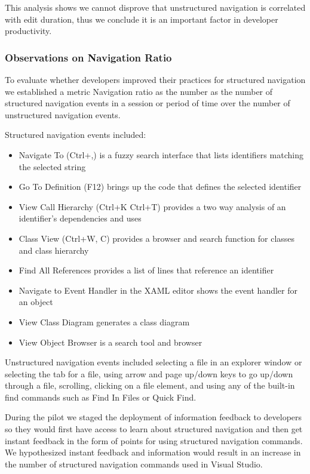 \documentclass{sig-alternate}
\begin{document}
This analysis shows we cannot disprove that unstructured navigation is correlated with edit duration, thus we conclude it is an important factor in developer productivity.  

\subsubsection{Observations on Navigation Ratio}

To evaluate whether developers improved their practices for structured navigation we established a metric Navigation ratio as the number as the number of structured navigation events in a session or period of time over the number of unstructured navigation events.  

Structured navigation events included: 
\begin{itemize}[itemsep=0mm]
\item Navigate To (Ctrl+,) is a fuzzy search interface that lists identifiers matching the selected string 
\item Go To Definition (F12) brings up the code that defines the selected identifier 
\item View Call Hierarchy (Ctrl+K Ctrl+T) provides a two way analysis of an identifier's dependencies and uses
\item Class View (Ctrl+W, C) provides a browser and search function for classes and class hierarchy
\item Find All References provides a list of lines that reference an identifier
\item Navigate to Event Handler in the XAML editor shows the event handler for an object
\item View Class Diagram generates a class diagram 
\item View Object Browser is a search tool and browser
\end{itemize}

Unstructured navigation events included selecting a file in an explorer window or selecting the tab for a file, using arrow and page up/down keys to go up/down through a file, scrolling, clicking on a file element, and using any of the built-in find commands such as Find In Files or Quick Find.

During the pilot we staged the deployment of information feedback to developers so they would first have access to learn about structured navigation and then get instant feedback in the form of points for using structured navigation commands.  We hypothesized instant feedback and information would result in an increase in the number of structured navigation commands used in Visual Studio.
\end{document}
